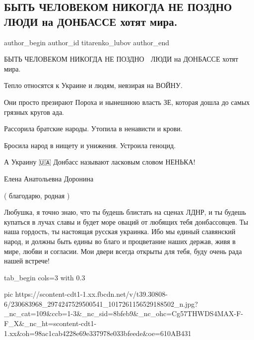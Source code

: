  
 
 
 
 
 
\subsection{БЫТЬ ЧЕЛОВЕКОМ  НИКОГДА НЕ ПОЗДНО 🙏ЛЮДИ на ДОНБАССЕ хотят мира.}
\label{sec:01_08_2021.fb.titarenko_lubov.1.donbass_mir}
 
\ifcmt
 author_begin
   author_id titarenko_lubov
 author_end
\fi

БЫТЬ ЧЕЛОВЕКОМ  НИКОГДА НЕ ПОЗДНО 🙏 ЛЮДИ на ДОНБАССЕ хотят мира.

Тепло относятся к Украине и людям, невзирая на ВОЙНУ.

Они просто презирают Пороха и нынешнюю власть ЗЕ,
которая дошла до самых грязных кругов ада. 

Рассорила братские народы. Утопила в ненависти и крови.

Бросила народ в нищету и унижения. Устроила геноцид.

А Украину 🇺🇦 Донбасс называют ласковым словом НЕНЬКА! 

Елена Анатольевна Доронина 

( благодарю, родная )

Любушка, я точно знаю, что ты будешь блистать на сценах ЛДНР, и ты будешь
купаться в лучах славы и будет море оваций от любящих тебя донбассовцев. Ты
наша гордость, ты настоящая русская украинка. Ибо мы единый славянский народ, и
должны быть едины во благо и процветание наших держав, живя в мире, любви и
согласии. Мои двери всегда открыты для тебя, буду очень рада нашей встрече!


\ifcmt
  tab_begin cols=3
		with 0.3

     pic https://scontent-cdt1-1.xx.fbcdn.net/v/t39.30808-6/230683968_2974247529500541_1017261156529188502_n.jpg?_nc_cat=109&ccb=1-3&_nc_sid=8bfeb9&_nc_ohc=Cg57THWDS4MAX-F-F_X&_nc_ht=scontent-cdt1-1.xx&oh=98ac1cab4228e69e337978e033bfeede&oe=610AB431

